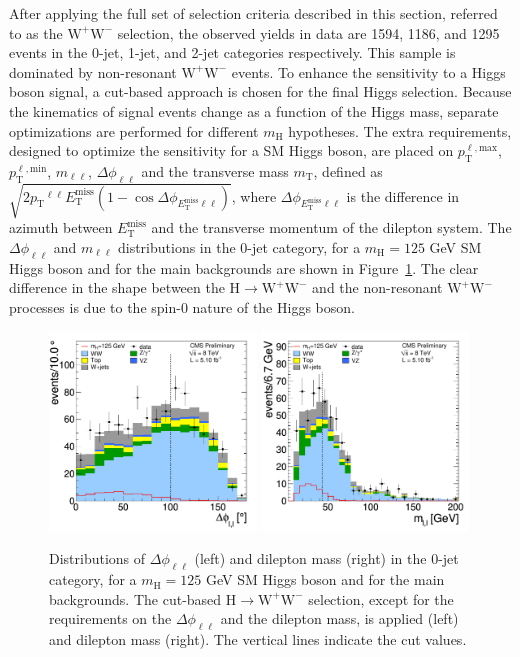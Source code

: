 \documentclass{PoS}
\newcommand{\Hi}{\ensuremath{\mathrm{H}}}
\newcommand{\W}{\ensuremath{\mathrm{W}}}
\newcommand{\WW}{\ensuremath{\W^+\W^-}}
\newcommand{\Lep}{\ensuremath{\mathrm{\ell}}}
\newcommand{\mHi}{\ensuremath{m_{\mathrm{H}}}}
\newcommand{\mll}{\ensuremath{m_{\Lep\Lep}}}
\newcommand{\pt}{\ensuremath{p_\mathrm{T}}}
\newcommand{\ptlmax}{\ensuremath{p_{\mathrm{T}}^{\Lep,\mathrm{max}}}}
\newcommand{\ptlmin}{\ensuremath{p_{\mathrm{T}}^{\Lep,\mathrm{min}}}}
\newcommand{\ETm}{\ensuremath{E_{\mathrm{T}}^{\mathrm{miss}}}}
\newcommand{\met}{\ETm}
\newcommand{\MET}{\ETm}
\newcommand{\delphill}{\ensuremath{\Delta\phi_{\Lep\Lep}}}
\newcommand{\delphimetll}{\ensuremath{\Delta\phi_{\met\Lep\Lep}}}
\newcommand{\hww}{\Hi\to\WW}
\begin{document}
After applying the full set of selection criteria described in this
section, referred to as the $\WW$ selection, the observed yields in
data are 1594, 1186, and 1295 events in the 0-jet, 1-jet, and 2-jet
categories respectively. This sample is dominated by non-resonant
$\WW$ events.  To enhance the sensitivity to a Higgs boson signal, a
cut-based approach is chosen for the final Higgs selection. Because
the kinematics of signal events change as a function of the Higgs
mass, separate optimizations are performed for different $\mHi$
hypotheses. The extra requirements, designed to optimize the
sensitivity for a SM Higgs boson, are placed on $\ptlmax$, $\ptlmin$,
$\mll$, $\delphill$ and the transverse mass $m_\mathrm{T}$, defined as
$\sqrt{2 \pt^{\ell\ell} \MET (1-\cos\delphimetll)}$, where
$\delphimetll$ is the difference in azimuth between $\MET$ and the
transverse momentum of the dilepton system.  The $\delphill$ and
$\mll$ distributions in the 0-jet category, for a
$\mHi=125$ GeV SM Higgs boson and for the main backgrounds are shown
in Figure~\ref{fig:dphillHWW}.  The clear difference in the shape
between the $\Hi \to \WW$ and the non-resonant $\WW$ processes is due
to the spin-0 nature of the Higgs boson.

\begin{figure}[htbp]
\begin{center}
   \includegraphics[width=0.49\textwidth]{dPhi_N-2_mh125_nj0.pdf}
   \includegraphics[width=0.49\textwidth]{dilepmass_N-1_mh125_nj0.pdf}
	\caption{Distributions of $\delphill$ (left) and dilepton mass
          (right) in the 0-jet category, for a $\mHi=125$ GeV SM Higgs
          boson and for the main backgrounds.  The cut-based $\hww$
          selection, except for the requirements on the $\delphill$
          and the dilepton mass, is applied (left) and dilepton mass (right). The vertical
          lines indicate the cut values.}  \label{fig:dphillHWW}
\end{center}
\end{figure}
\end{document}

